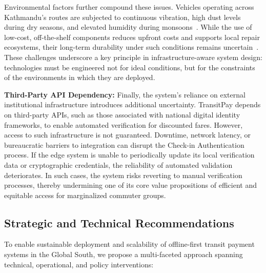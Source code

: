 \documentclass[manuscript,review,anonymous]{acmart}
\begin{document}
Environmental factors further compound these issues. Vehicles operating across Kathmandu’s routes are subjected to continuous vibration, high dust levels during dry seasons, and elevated humidity during monsoons~\cite{ghimire2008assessment}. While the use of low-cost, off-the-shelf components reduces upfront costs and supports local repair ecosystems, their long-term durability under such conditions remains uncertain~\cite{Industriapart2024Durability}. These challenges underscore a key principle in infrastructure-aware system design: technologies must be engineered not for ideal conditions, but for the constraints of the environments in which they are deployed.

\textbf{Third-Party API Dependency:} 
Finally, the system’s reliance on external institutional infrastructure introduces additional uncertainty. TransitPay depends on third-party APIs, such as those associated with national digital identity frameworks, to enable automated verification for discounted fares. However, access to such infrastructure is not guaranteed. Downtime, network latency, or bureaucratic barriers to integration can disrupt the Check-in Authentication process. If the edge system is unable to periodically update its local verification data or cryptographic credentials, the reliability of automated validation deteriorates. In such cases, the system risks reverting to manual verification processes, thereby undermining one of its core value propositions of efficient and equitable access for marginalized commuter groups.

\subsection{Strategic and Technical Recommendations}

To enable sustainable deployment and scalability of offline-first transit payment systems in the Global South, we propose a multi-faceted approach spanning technical, operational, and policy interventions:
\end{document}
